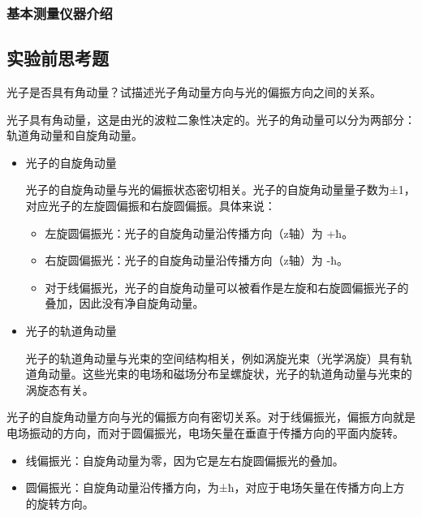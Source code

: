 \documentclass[dvipsnames, svgnames,a4paper,11pt]{article}
\begin{document}
	\subsubsection{基本测量仪器介绍}



   

        



\clearpage

\subsection{实验前思考题}



\begin{question}
	光子是否具有角动量？试描述光子角动量方向与光的偏振方向之间的关系。
\end{question}

	光子具有角动量，这是由光的波粒二象性决定的。光子的角动量可以分为两部分：轨道角动量和自旋角动量。

		\begin{itemize}
			\item 光子的自旋角动量
			
				光子的自旋角动量与光的偏振状态密切相关。光子的自旋角动量量子数为±1，对应光子的左旋圆偏振和右旋圆偏振。具体来说：

				\begin{itemize}
					\item 左旋圆偏振光：光子的自旋角动量沿传播方向（z轴）为 +ħ。
					\item 右旋圆偏振光：光子的自旋角动量沿传播方向（z轴）为 -ħ。
					\item 对于线偏振光，光子的自旋角动量可以被看作是左旋和右旋圆偏振光子的叠加，因此没有净自旋角动量。
				\end{itemize}
			
			\item 光子的轨道角动量
			
				光子的轨道角动量与光束的空间结构相关，例如涡旋光束（光学涡旋）具有轨道角动量。这些光束的电场和磁场分布呈螺旋状，光子的轨道角动量与光束的涡旋态有关。
		\end{itemize}


	光子的自旋角动量方向与光的偏振方向有密切关系。对于线偏振光，偏振方向就是电场振动的方向，而对于圆偏振光，电场矢量在垂直于传播方向的平面内旋转。
		
		\begin{itemize}
			\item 线偏振光：自旋角动量为零，因为它是左右旋圆偏振光的叠加。
			\item 圆偏振光：自旋角动量沿传播方向，为±ħ，对应于电场矢量在传播方向上方的旋转方向。
		\end{itemize}
	
\end{document}
